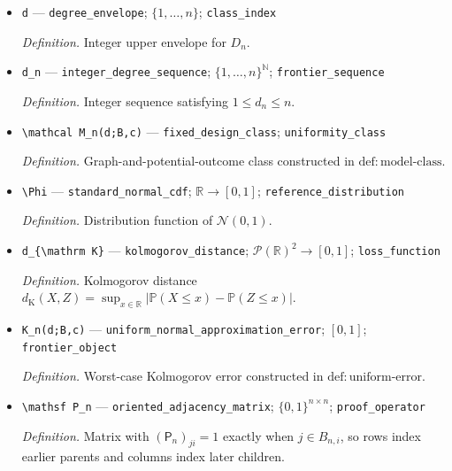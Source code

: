 \documentclass{article}
\begin{document}
\begin{itemize}
  \item \texttt{d} --- \texttt{degree\_\allowbreak{}envelope}; \(\{1,\ldots,n\}\); \texttt{class\_\allowbreak{}index}
  \par\smallskip\noindent\emph{Definition.} Integer upper envelope for \(D_n\).
  \item \texttt{d\_\allowbreak{}n} --- \texttt{integer\_\allowbreak{}degree\_\allowbreak{}sequence}; \(\{1,\ldots,n\}^{\mathbb N}\); \texttt{frontier\_\allowbreak{}sequence}
  \par\smallskip\noindent\emph{Definition.} Integer sequence satisfying \(1\le d_n\le n\).
  \item \texttt{\textbackslash{}\allowbreak{}mathcal M\_\allowbreak{}n(d;\allowbreak{}B,\allowbreak{}c)} --- \texttt{fixed\_\allowbreak{}design\_\allowbreak{}class}; \texttt{uniformity\_\allowbreak{}class}
  \par\smallskip\noindent\emph{Definition.} Graph-and-potential-outcome class constructed in \(\mathrm{def:model\text{-}class}\).
  \item \texttt{\textbackslash{}\allowbreak{}Phi} --- \texttt{standard\_\allowbreak{}normal\_\allowbreak{}cdf}; \(\mathbb R\to[0,1]\); \texttt{reference\_\allowbreak{}distribution}
  \par\smallskip\noindent\emph{Definition.} Distribution function of \(\mathcal N(0,1)\).
  \item \texttt{d\_\allowbreak{}\{\textbackslash{}\allowbreak{}mathrm K\}\allowbreak{}} --- \texttt{kolmogorov\_\allowbreak{}distance}; \(\mathcal P(\mathbb R)^2\to[0,1]\); \texttt{loss\_\allowbreak{}function}
  \par\smallskip\noindent\emph{Definition.} Kolmogorov distance \(d_{\mathrm K}(X,Z)=\sup_{x\in\mathbb R}|\mathbb P(X\le x)-\mathbb P(Z\le x)|\).
  \item \texttt{K\_\allowbreak{}n(d;\allowbreak{}B,\allowbreak{}c)} --- \texttt{uniform\_\allowbreak{}normal\_\allowbreak{}approximation\_\allowbreak{}error}; \([0,1]\); \texttt{frontier\_\allowbreak{}object}
  \par\smallskip\noindent\emph{Definition.} Worst-case Kolmogorov error constructed in \(\mathrm{def:uniform\text{-}error}\).
  \item \texttt{\textbackslash{}\allowbreak{}mathsf P\_\allowbreak{}n} --- \texttt{oriented\_\allowbreak{}adjacency\_\allowbreak{}matrix}; \(\{0,1\}^{n\times n}\); \texttt{proof\_\allowbreak{}operator}
  \par\smallskip\noindent\emph{Definition.} Matrix with \((\mathsf P_n)_{ji}=1\) exactly when \(j\in B_{n,i}\), so rows index earlier parents and columns index later children.

\end{itemize}
\end{document}
